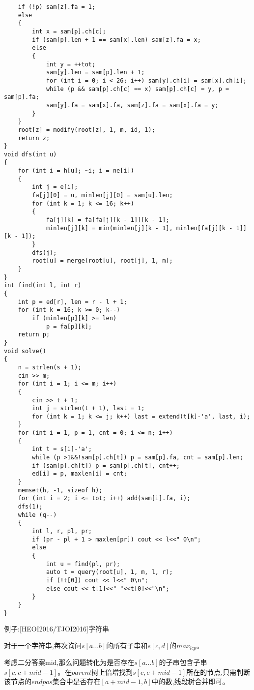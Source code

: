 \documentclass[a4paper, fontset=none]{ctexart}
\begin{document}
\begin{verbatim}
    if (!p) sam[z].fa = 1;
    else
    {
        int x = sam[p].ch[c];
        if (sam[p].len + 1 == sam[x].len) sam[z].fa = x;
        else
        {
            int y = ++tot;
            sam[y].len = sam[p].len + 1;
            for (int i = 0; i < 26; i++) sam[y].ch[i] = sam[x].ch[i];
            while (p && sam[p].ch[c] == x) sam[p].ch[c] = y, p = sam[p].fa;
            sam[y].fa = sam[x].fa, sam[z].fa = sam[x].fa = y;
        }
    }
    root[z] = modify(root[z], 1, m, id, 1);
    return z;
}
void dfs(int u)
{
    for (int i = h[u]; ~i; i = ne[i])
    {
        int j = e[i];
        fa[j][0] = u, minlen[j][0] = sam[u].len;
        for (int k = 1; k <= 16; k++)
        {
            fa[j][k] = fa[fa[j][k - 1]][k - 1];
            minlen[j][k] = min(minlen[j][k - 1], minlen[fa[j][k - 1]][k - 1]);
        }
        dfs(j);
        root[u] = merge(root[u], root[j], 1, m);
    }
}
int find(int l, int r)
{
    int p = ed[r], len = r - l + 1;
    for (int k = 16; k >= 0; k--)
        if (minlen[p][k] >= len)
            p = fa[p][k];
    return p;
}
void solve()
{
    n = strlen(s + 1);
    cin >> m;
    for (int i = 1; i <= m; i++)
    {
        cin >> t + 1;
        int j = strlen(t + 1), last = 1;
        for (int k = 1; k <= j; k++) last = extend(t[k]-'a', last, i);
    }
    for (int i = 1, p = 1, cnt = 0; i <= n; i++)
    {
        int t = s[i]-'a';
        while (p >1&&!sam[p].ch[t]) p = sam[p].fa, cnt = sam[p].len;
        if (sam[p].ch[t]) p = sam[p].ch[t], cnt++;
        ed[i] = p, maxlen[i] = cnt;
    }
    memset(h, -1, sizeof h);
    for (int i = 2; i <= tot; i++) add(sam[i].fa, i);
    dfs(1);
    while (q--)
    {
        int l, r, pl, pr;
        if (pr - pl + 1 > maxlen[pr]) cout << l<<" 0\n";
        else
        {
            int u = find(pl, pr);
            auto t = query(root[u], 1, m, l, r);
            if (!t[0]) cout << l<<" 0\n";
            else cout << t[1]<<" "<<t[0]<<"\n";
        }
    }
}
\end{verbatim}

例子:[HEOI2016/TJOI2016]字符串

对于一个字符串,每次询问$s[a...b]$的所有子串和$s[c, d]$的$max_{lcp}$。

考虑二分答案mid,那么问题转化为是否存在$s[a...b]$的子串包含子串$s[c, c+mid-1]$。在$parent$树上倍增找到$s[c, c+mid-1]$所在的节点,只需判断该节点的$endpos$集合中是否存在$[a+mid-1, b]$中的数,线段树合并即可。
\end{document}
